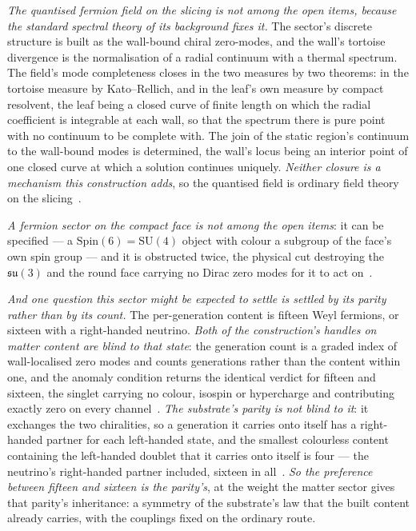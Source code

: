 \documentclass[11pt,a4paper]{article}
\theoremstyle{plain}
\theoremstyle{definition}
\begin{document}
\emph{The quantised fermion field on the slicing is not among the open items, because the standard spectral theory of its background fixes it.} The sector's discrete structure is built as the wall-bound chiral zero-modes, and the wall's tortoise divergence is the normalisation of a radial continuum with a thermal spectrum. The field's mode completeness closes in the two measures by two theorems: in the tortoise measure by Kato--Rellich, and in the leaf's own measure by compact resolvent, the leaf being a closed curve of finite length on which the radial coefficient is integrable at each wall, so that the spectrum there is pure point with no continuum to be complete with. The join of the static region's continuum to the wall-bound modes is determined, the wall's locus being an interior point of one closed curve at which a solution continues uniquely. \emph{Neither closure is a mechanism this construction adds}, so the quantised field is ordinary field theory on the slicing~\cite{JanzenMatter,JanzenCRframework}.

\emph{A fermion sector on the compact face is not among the open items}: it can be specified --- a
$\mathrm{Spin}(6)=\mathrm{SU}(4)$ object with colour a subgroup of the face's own spin group --- and it is obstructed
twice, the physical cut destroying the $\mathfrak{su}(3)$ and the round face carrying no Dirac zero modes for it to act
on~\cite{JanzenBoundary}.

\emph{And one question this sector might be expected to settle is settled by its parity rather than by its
count.} The per-generation content is fifteen Weyl fermions, or sixteen with a right-handed neutrino. \emph{Both of the
construction's handles on matter content are blind to that state}: the generation count is a graded index of
wall-localised zero modes and counts generations rather than the content within one, and the anomaly
condition returns the identical verdict for fifteen and sixteen, the singlet carrying no colour, isospin or
hypercharge and contributing exactly zero on every channel~\cite{JanzenMatter}. \emph{The substrate's parity is
not blind to it}: it exchanges the two chiralities, so a generation it carries onto itself has a right-handed
partner for each left-handed state, and the smallest colourless content containing the left-handed doublet that
it carries onto itself is four --- the neutrino's right-handed partner included, sixteen in
all~\cite{JanzenMatter}. \emph{So the preference between fifteen and sixteen is the parity's}, at the weight the
matter sector gives that parity's inheritance: a symmetry of the substrate's law that the built content already
carries, with the couplings fixed on the ordinary route.
\end{document}

